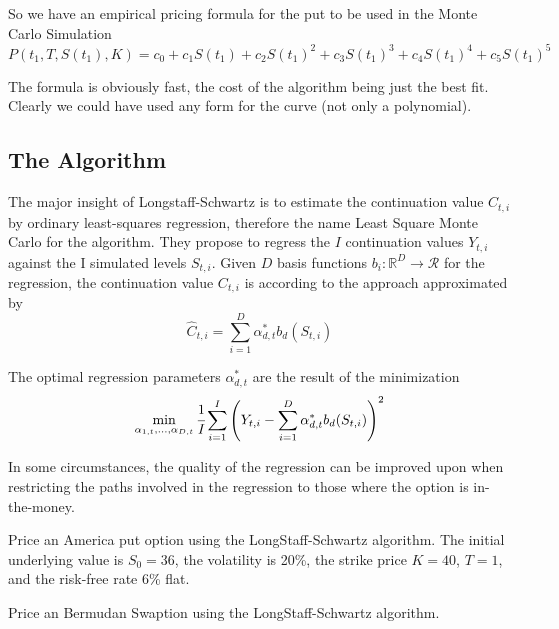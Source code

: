\documentclass[12pt,a4paper]{article}
\begin{document}
So we have an empirical pricing formula for the put to be used in the Monte Carlo Simulation
\begin{equation}
	P(t_1,T,S(t_1),K)=c_0+c_1 S(t_1) + c_2 S(t_1)^2 + c_3 S(t_1)^3 + c_4 S(t_1)^4 + c_5 S(t_1)^5
\end{equation}

The formula is obviously fast, the cost of the algorithm being just the best fit. Clearly we could have used any form for the curve (not only a polynomial). 

\subsection{The Algorithm}
The major insight of Longstaff-Schwartz is to estimate the continuation value $C_{t,i}$ by ordinary least-squares regression, therefore the name Least Square Monte Carlo for the algorithm. 
They propose to regress the $I$ continuation values $Y_{t,i}$ against the I simulated levels $S_{t,i}$. Given $D$ basis functions $b_i:\mathbb{R}^D\rightarrow\mathcal{R}$ for the regression, the continuation value $C_{t,i}$ is according to the approach approximated by
\begin{equation}
	\hat{C}_{t,i}=\sum_{i=1}^D \alpha^*_{d,t}b_d(S_{t,i})
	\label{eq:continuation_approx}
\end{equation}

The optimal regression parameters $\alpha^*_{d,t}$ are the result of the minimization
\begin{equation}
	\min_{\alpha_{1,t},\ldots,\alpha_{D,t}}\cfrac{1}{I}\sum_{i=1}^I \left(Y_{t,i}-\sum_{i=1}^D\alpha^*_{d,t}b_d(S_{t,i})\right)^2
	\label{eq:optimization_alphas}	
\end{equation}

In some circumstances, the quality of the regression can be improved upon when restricting the paths involved in the regression to those where the option is in-the-money.

\begin{question}
Price an America put option using the LongStaff-Schwartz algorithm. The initial underlying value is $S_0=36$, the volatility is 20\%, the strike price $K=40$, $T=1$, and the risk-free rate 6\% flat.
\end{question}

\begin{question}
Price an Bermudan Swaption using the LongStaff-Schwartz algorithm. %
\end{question}
\end{document}
